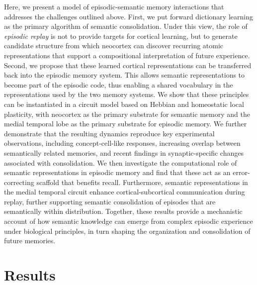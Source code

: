 \documentclass{article}
\begin{document}
Here, we present a model of episodic-semantic memory interactions that addresses the challenges outlined above. First, we put forward dictionary learning as the primary algorithm of semantic consolidation. Under this view, the role of \textit{episodic replay} is not to provide targets for cortical learning, but to generate candidate structure from which neocortex can discover recurring atomic representations that support a compositional interpretation of future experience. Second, we propose that these learned cortical representations can be transferred back into the episodic memory system. This allows semantic representations to become part of the episodic code, thus enabling a shared vocabulary in the representations used by the two memory systems. We show that these principles can be instantiated in a circuit model based on Hebbian and homeostatic local plasticity, with neocortex as the primary substrate for semantic memory and the medial temporal lobe as the primary substrate for episodic memory. We further demonstrate that the resulting dynamics reproduce key experimental observations, including concept-cell-like responses, increasing overlap between semantically related memories, and recent findings in synaptic-specific changes associated with consolidation. We then investigate the computational role of semantic representations in episodic memory and find that these act as an error-correcting scaffold that benefits recall. Furthermore, semantic representations in the medial temporal circuit enhance cortical-subcortical communication during replay, further supporting semantic consolidation of episodes that are semantically within distribution. Together, these results provide a mechanistic account of how semantic knowledge can emerge from complex episodic experience under biological principles, in turn shaping the organization and consolidation of future memories.
\newpage
\section*{Results}
\end{document}
